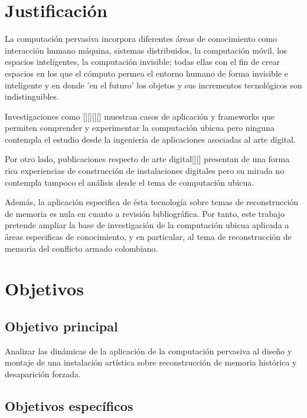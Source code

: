 \section{Justificación}

La computación pervasiva incorpora diferentes áreas de conocimiento como interacción humano máquina, sistemas distribuidos, la computación móvil, los espacios inteligentes, la computación invisible; todas ellas con el fin de crear espacios en los que el cómputo permea el entorno humano de forma invisible e inteligente y en donde 'en el futuro' los objetos y sus incrementos tecnológicos son indistinguibles. \cite{}


Investigaciones como [][][][] muestran casos de aplicación y frameworks que permiten comprender y experimentar la computación ubicua pero ninguna contempla el estudio desde la ingeniería de aplicaciones asociadas al arte digital. 




Por otro lado, publicaciones respecto de arte digital[][] presentan de una forma rica experiencias de construcción de instalaciones digitales pero su mirada no contempla tampoco el análisis desde el tema de computación ubicua. 

Además, la aplicación especifica de ésta tecnología sobre temas de reconstrucción de memoria es nula en cuanto a revisión bibliográfica. Por tanto, este trabajo pretende ampliar la base de investigación de la computación ubicua aplicada a áreas especificas de conocimiento, y en particular, al tema de reconstrucción de memoria del conflicto armado colombiano.   

\section{Objetivos}

\subsection{Objetivo principal}

Analizar las dinámicas de la aplicación de la computación pervasiva al diseño y montaje de una instalación artística sobre reconstrucción de memoria histórica y desaparición forzada.

\subsection{Objetivos específicos}


